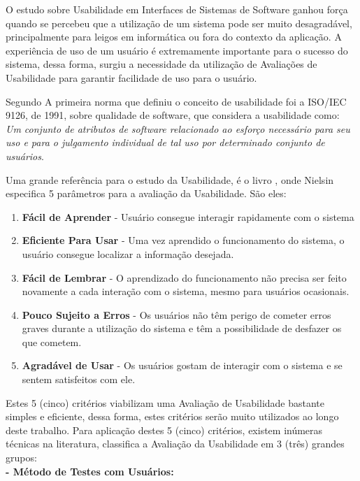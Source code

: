 

O estudo sobre Usabilidade em Interfaces de Sistemas de Software ganhou força quando se percebeu que a utilização de um sistema pode ser muito desagradável, principalmente para leigos em informática ou fora do contexto da aplicação. A experiência de uso de um usuário é extremamente importante para o sucesso do sistema, dessa forma, surgiu a necessidade da utilização de Avaliações de Usabilidade para garantir facilidade de uso para o usuário.

Segundo \cite{avaliacao_heuristica} A primeira norma que definiu o conceito de usabilidade foi a ISO/IEC 9126, de 1991, sobre qualidade de software, que considera a usabilidade como: \textit{Um conjunto de atributos de software relacionado ao esforço necessário para seu uso e para o julgamento individual de tal uso por determinado conjunto de usuários}.

Uma grande referência para o estudo da Usabilidade, é o livro \cite{usabilidade_web}, onde Nielsin especifica 5 parâmetros para a avaliação da Usabilidade. São eles: 

\begin{enumerate}
  \item \textbf{Fácil de Aprender} - Usuário consegue interagir rapidamente com o sistema
  \item \textbf{Eficiente Para Usar} - Uma vez aprendido o funcionamento do sistema, o usuário consegue localizar a informação desejada.
  \item \textbf{Fácil de Lembrar} - O aprendizado do funcionamento não precisa ser feito novamente a cada interação com o sistema, mesmo para usuários ocasionais.
  \item \textbf{Pouco Sujeito a Erros} - Os usuários não têm perigo de cometer erros graves durante a utilização do
sistema e têm a possibilidade de desfazer os que cometem.
  \item \textbf{Agradável de Usar} - Os usuários gostam de interagir com o sistema e se sentem satisfeitos com ele.
\end{enumerate}

Estes 5 (cinco) critérios viabilizam uma Avaliação de Usabilidade bastante simples e eficiente, dessa forma, estes critérios serão muito utilizados ao longo deste trabalho. Para aplicação destes 5 (cinco) critérios, existem inúmeras técnicas na literatura, \cite{avaliacao_usa} classifica a Avaliação da Usabilidade em 3 (três) grandes grupos:
\\

\textbf{- Método de Testes com Usuários:}
	\\

